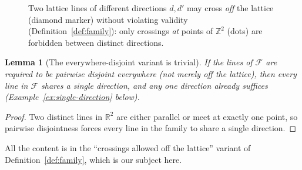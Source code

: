 \documentclass[a4paper,11pt,oneside,reqno]{amsart}
\theoremstyle{definition}
\theoremstyle{remark}
\theoremstyle{plain}
\newtheorem{lemma}[definition]{Lemma}
\newcommand{\Z}{\mathbb{Z}}
\newcommand{\R}{\mathbb{R}}
\begin{document}
\begin{figure}[h]
  \centering
  \caption{Two lattice lines of different directions \(d,d'\) may cross \emph{off} the lattice
  (diamond marker) without violating validity (Definition~\ref{def:family}): only crossings
  \emph{at} points of \(\Z^2\) (dots) are forbidden between distinct directions.}
  \label{fig:offlattice-crossing}
\end{figure}

\begin{lemma}[The everywhere-disjoint variant is trivial]
  \label{lem:everywhere-disjoint-trivial}
  If the lines of \(\mathcal F\) are required to be pairwise disjoint everywhere (not merely off the
  lattice), then every line in \(\mathcal F\) shares a single direction, and any one direction
  already suffices (Example~\ref{ex:single-direction} below).
\end{lemma}

\begin{proof}
  Two distinct lines in \(\R^2\) are either parallel or meet at exactly one point, so pairwise
  disjointness forces every line in the family to share a single direction.
\end{proof}

All the content is in the ``crossings allowed off the lattice'' variant of
Definition~\ref{def:family}, which is our subject here.
\end{document}
